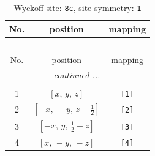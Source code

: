 \documentclass[fleqn,8pt]{jsarticle}
\begin{document}
\renewcommand{\arraystretch}{1.2}
\begin{longtable}{ccc}
\caption{Wyckoff site: {\tt 8c}, site symmetry: {\tt 1}}
 \\
 \hline \hline
No. & position & mapping \\ \hline \endfirsthead

\multicolumn{2}{l}{\tablename\ \thetable{}} \\
 \hline \hline
No. & position & mapping \\ \hline \endhead

 \hline \hline
\multicolumn{2}{r}{\footnotesize\it continued ...} \\ \endfoot

 \hline \hline
\multicolumn{2}{r}{} \\ \endlastfoot

1 & $\left[ x,\, y,\, z \right]$ & {\tt [1]} \\ \hline
2 & $\left[ - x,\, - y,\, z + \frac{1}{2} \right]$ & {\tt [2]} \\ \hline
3 & $\left[ - x,\, y,\, \frac{1}{2} - z \right]$ & {\tt [3]} \\ \hline
4 & $\left[ x,\, - y,\, - z \right]$ & {\tt [4]} \\
\end{longtable}
\end{document}
